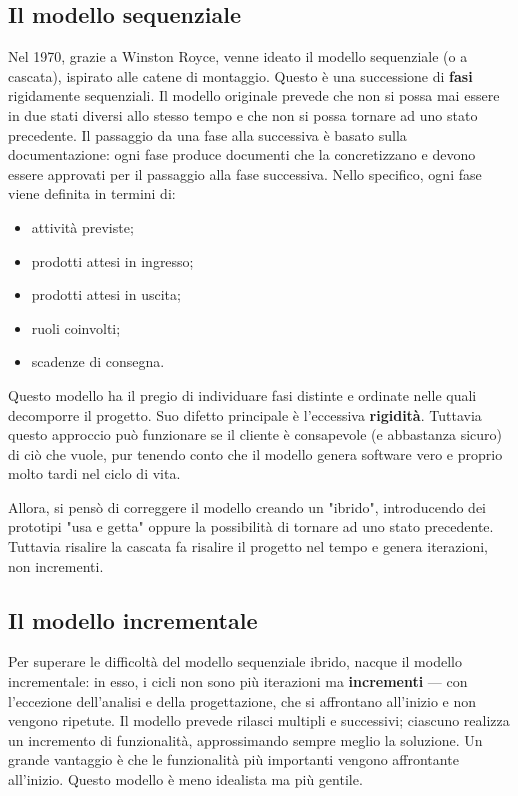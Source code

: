 \documentclass[a4paper]{article}
\begin{document}
		
	\subsection{Il modello sequenziale}

		
Nel 1970, grazie a Winston Royce, venne ideato il modello sequenziale (o a cascata), ispirato alle catene di montaggio. Questo è una successione di \textbf{fasi} rigidamente sequenziali. Il modello originale prevede che non si possa mai essere in due stati diversi allo stesso tempo e che non si possa tornare ad uno stato precedente. Il passaggio da una fase alla successiva è basato sulla documentazione: ogni fase produce documenti che la concretizzano e devono essere approvati per il passaggio alla fase successiva. Nello specifico, ogni fase viene definita in termini di:
		
	\begin{itemize}
		
			
	\item attività previste;
			
	\item prodotti attesi in ingresso;
			
	\item prodotti attesi in uscita;
			
	\item ruoli coinvolti;
			
	\item scadenze di consegna.
		
	\end{itemize}

		
Questo modello ha il pregio di individuare fasi distinte e ordinate nelle quali decomporre il progetto. Suo difetto principale è l'eccessiva \textbf{rigidità}. Tuttavia questo approccio può funzionare se il cliente è consapevole (e abbastanza sicuro) di ciò che vuole, pur tenendo conto che il modello genera software vero e proprio molto tardi nel ciclo di vita.
		
Allora, si pensò di correggere il modello creando un "ibrido", introducendo dei prototipi "usa e getta" oppure la possibilità di tornare ad uno stato precedente. Tuttavia risalire la cascata fa risalire il progetto nel tempo e genera iterazioni, non incrementi.

		
	\subsection{Il modello incrementale}

		
Per superare le difficoltà del modello sequenziale ibrido, nacque il modello incrementale: in esso, i cicli non sono più iterazioni ma \textbf{incrementi} — con l'eccezione dell'analisi e della progettazione, che si affrontano all'inizio e non vengono ripetute. Il modello prevede rilasci multipli e successivi; ciascuno realizza un incremento di funzionalità, approssimando sempre meglio la soluzione. Un grande vantaggio è che le funzionalità più importanti vengono affrontante all'inizio. Questo modello è meno idealista ma più gentile.
\end{document}
